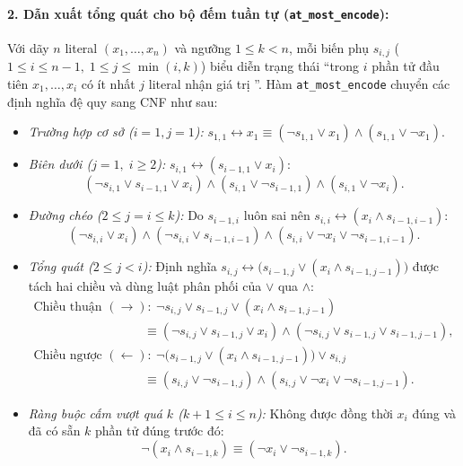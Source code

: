 \documentclass[12pt,a4paper]{article}
\begin{document}
\paragraph{2. Dẫn xuất tổng quát cho bộ đếm tuần tự (\texttt{at\_most\_encode}):}
Với dãy $n$ literal $(x_1, \dots, x_n)$ và ngưỡng $1 \le k < n$, mỗi biến phụ $s_{i,j}$ ($1 \le i \le n - 1,\; 1 \le j \le \min(i, k)$) biểu diễn trạng thái ``trong $i$ phần tử đầu tiên $x_1, \dots, x_i$ có ít nhất $j$ literal nhận giá trị ''. Hàm \texttt{at\_most\_encode} chuyển các định nghĩa đệ quy sang CNF như sau:
\begin{itemize}
    \item \emph{Trường hợp cơ sở ($i = 1, j = 1$):} $s_{1,1} \leftrightarrow x_1 \equiv (\neg s_{1,1} \lor x_1) \land (s_{1,1} \lor \neg x_1)$.
    \item \emph{Biên dưới ($j = 1,\; i \ge 2$):} $s_{i,1} \leftrightarrow (s_{i-1,1} \lor x_i)$:
    \[
    (\neg s_{i,1} \lor s_{i-1,1} \lor x_i) \land (s_{i,1} \lor \neg s_{i-1,1}) \land (s_{i,1} \lor \neg x_i).
    \]
    \item \emph{Đường chéo ($2 \le j = i \le k$):} Do $s_{i-1,i}$ luôn sai nên $s_{i,i} \leftrightarrow (x_i \land s_{i-1,i-1})$:
    \[
    (\neg s_{i,i} \lor x_i) \land (\neg s_{i,i} \lor s_{i-1,i-1}) \land (s_{i,i} \lor \neg x_i \lor \neg s_{i-1,i-1}).
    \]
    \item \emph{Tổng quát ($2 \le j < i$):} Định nghĩa $s_{i,j} \leftrightarrow \big(s_{i-1,j} \lor (x_i \land s_{i-1,j-1})\big)$ được tách hai chiều và dùng luật phân phối của $\lor$ qua $\land$:
    \begin{align*}
    \text{Chiều thuận } (\to): &\quad \neg s_{i,j} \lor s_{i-1,j} \lor (x_i \land s_{i-1,j-1}) \\
    &\equiv (\neg s_{i,j} \lor s_{i-1,j} \lor x_i) \land (\neg s_{i,j} \lor s_{i-1,j} \lor s_{i-1,j-1}), \\
    \text{Chiều ngược } (\leftarrow): &\quad \neg\big(s_{i-1,j} \lor (x_i \land s_{i-1,j-1})\big) \lor s_{i,j} \\
    &\equiv (s_{i,j} \lor \neg s_{i-1,j}) \land (s_{i,j} \lor \neg x_i \lor \neg s_{i-1,j-1}).
    \end{align*}
    \item \emph{Ràng buộc cấm vượt quá $k$ ($k + 1 \le i \le n$):} Không được đồng thời $x_i$ đúng và đã có sẵn $k$ phần tử đúng trước đó:
    \[
    \neg(x_i \land s_{i-1,k}) \equiv (\neg x_i \lor \neg s_{i-1,k}).
    \]
\end{itemize}
\end{document}
